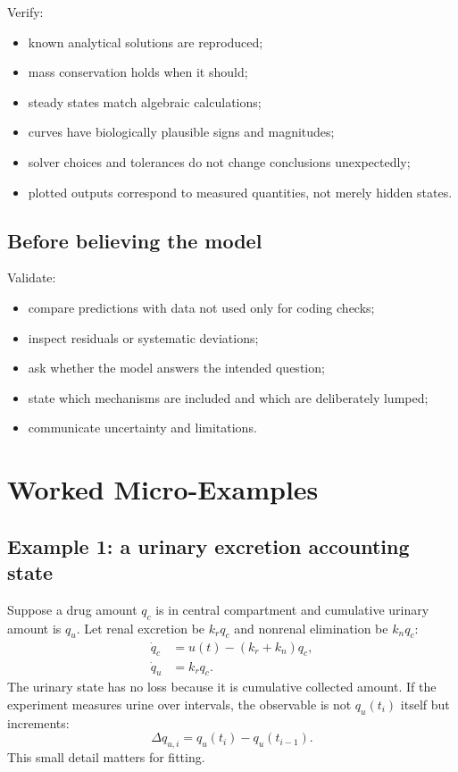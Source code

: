 \documentclass[a4paper]{article}
\begin{document}
Verify:
\begin{itemize}[leftmargin=2em]
  \item known analytical solutions are reproduced;
  \item mass conservation holds when it should;
  \item steady states match algebraic calculations;
  \item curves have biologically plausible signs and magnitudes;
  \item solver choices and tolerances do not change conclusions unexpectedly;
  \item plotted outputs correspond to measured quantities, not merely hidden states.
\end{itemize}

\subsection{Before believing the model}

Validate:
\begin{itemize}[leftmargin=2em]
  \item compare predictions with data not used only for coding checks;
  \item inspect residuals or systematic deviations;
  \item ask whether the model answers the intended question;
  \item state which mechanisms are included and which are deliberately lumped;
  \item communicate uncertainty and limitations.
\end{itemize}

\section{Worked Micro-Examples}

\subsection{Example 1: a urinary excretion accounting state}

Suppose a drug amount \(q_c\) is in central compartment and cumulative urinary amount is \(q_u\). Let renal excretion be \(k_rq_c\) and nonrenal elimination be \(k_nq_c\):
\[
  \begin{aligned}
  \dot q_c&=u(t)-(k_r+k_n)q_c,\\
  \dot q_u&=k_rq_c.
  \end{aligned}
\]
The urinary state has no loss because it is cumulative collected amount. If the experiment measures urine over intervals, the observable is not \(q_u(t_i)\) itself but increments:
\[
  \Delta q_{u,i}=q_u(t_i)-q_u(t_{i-1}).
\]
This small detail matters for fitting.
\end{document}
